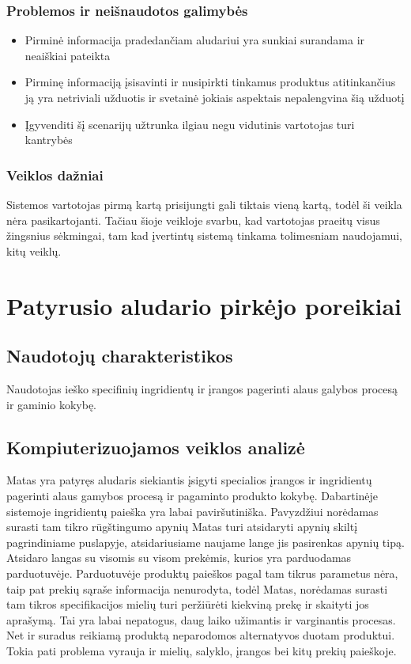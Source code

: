 \documentclass[oneside]{VUMIFPSkursinis}
\begin{document}
	\subsubsection{Problemos ir neišnaudotos galimybės}
		\begin{itemize}
			\item{Pirminė informacija pradedančiam aludariui yra sunkiai surandama ir neaiškiai pateikta}
			\item{Pirminę informaciją įsisavinti ir nusipirkti tinkamus produktus atitinkančius ją yra netriviali užduotis ir svetainė jokiais aspektais nepalengvina šią užduotį}
			\item{Įgyvenditi šį scenarijų užtrunka ilgiau negu vidutinis vartotojas turi kantrybės}
		\end{itemize}
	\subsubsection{Veiklos dažniai}
		Sistemos vartotojas pirmą kartą prisijungti gali tiktais vieną kartą, todėl ši veikla nėra pasikartojanti.
		Tačiau šioje veikloje svarbu, kad vartotojas praeitų visus žingsnius sėkmingai, tam kad įvertintų sistemą tinkama tolimesniam naudojamui, kitų veiklų.

\section{Patyrusio aludario pirkėjo poreikiai}
	\subsection{Naudotojų charakteristikos}
		Naudotojas ieško specifinių ingridientų ir įrangos pagerinti alaus galybos procesą ir gaminio kokybę.
	\subsection{Kompiuterizuojamos veiklos analizė}
		Matas yra patyręs aludaris siekiantis įsigyti specialios įrangos ir ingridientų pagerinti alaus gamybos procesą ir pagaminto produkto kokybę.
		Dabartinėje sistemoje ingridientų paieška yra labai paviršutiniška.
		Pavyzdžiui norėdamas surasti tam tikro rūgštingumo apynių Matas turi atsidaryti apynių skiltį pagrindiniame puslapyje, atsidariusiame naujame lange jis pasirenkas apynių tipą.
		Atsidaro langas su visomis su visom prekėmis, kurios yra parduodamas parduotuvėje.
		Parduotuvėje produktų paieškos pagal tam tikrus parametus nėra, taip pat prekių sąraše informacija nenurodyta, todėl Matas, norėdamas surasti tam tikros specifikacijos mielių turi peržiūrėti kiekviną prekę ir skaityti jos aprašymą.
		Tai yra labai nepatogus, daug laiko užimantis ir varginantis procesas.
		Net ir suradus reikiamą produktą neparodomos alternatyvos duotam produktui.
		Tokia pati problema vyrauja ir mielių, salyklo, įrangos bei kitų prekių paieškoje.
\end{document}

